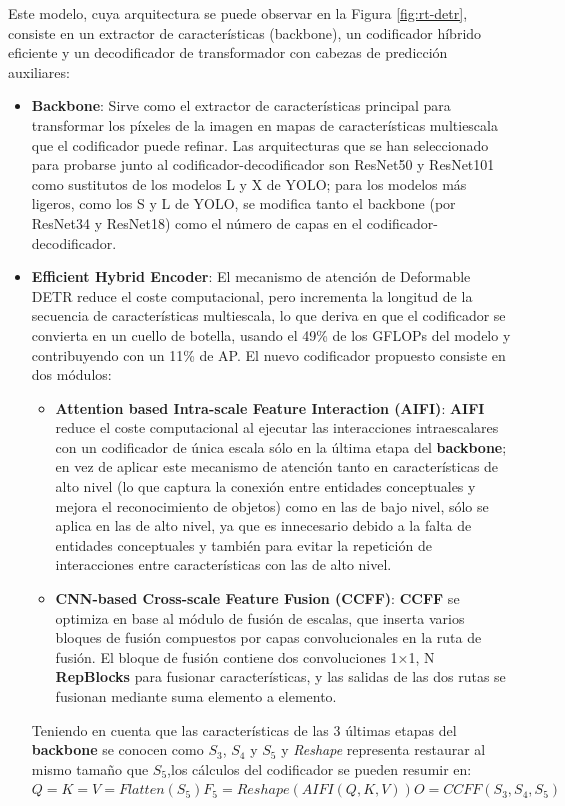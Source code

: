 \documentclass[12pt,a4paper,onecolumn,oneside]{report}
\begin{document}
Este modelo, cuya arquitectura se puede observar en la Figura \ref{fig:rt-detr}, consiste en un extractor de características (backbone), un codificador híbrido eficiente y un decodificador de transformador con cabezas de predicción auxiliares:
\begin{itemize}
    \item \textbf{Backbone}: Sirve como el extractor de características principal para transformar los píxeles de la imagen en mapas de características multiescala que el codificador puede refinar. Las arquitecturas que se han seleccionado para probarse junto al codificador-decodificador son ResNet50 y ResNet101 \cite{he2015deepresiduallearningimage} como sustitutos de los modelos L y X de YOLO; para los modelos más ligeros, como los S y L de YOLO, se modifica tanto el backbone (por ResNet34 y ResNet18) como el número de capas en el codificador-decodificador.
    
    \item \textbf{Efficient Hybrid Encoder}: El mecanismo de atención de Deformable DETR reduce el coste computacional, pero incrementa la longitud de la secuencia de características multiescala, lo que deriva en que el codificador se convierta en un cuello de botella, usando el 49\% de los GFLOPs del modelo y contribuyendo con un 11\% de AP. El nuevo codificador propuesto consiste en dos módulos:
    \begin{itemize}
        \item \textbf{Attention based Intra-scale Feature Interaction (AIFI)}: \textbf{AIFI} reduce el coste computacional al ejecutar las interacciones intraescalares con un codificador de única escala sólo en la última etapa del \textbf{backbone}; en vez de aplicar este mecanismo de atención tanto en características de alto nivel (lo que captura la conexión entre entidades conceptuales y mejora el reconocimiento de objetos) como en las de bajo nivel, sólo se aplica en las de alto nivel, ya que es innecesario debido a la falta de entidades conceptuales y también para evitar la repetición de interacciones entre características con las de alto nivel.
        \item \textbf{CNN-based Cross-scale Feature Fusion (CCFF)}: \textbf{CCFF} se optimiza en base al módulo de fusión de escalas, que inserta varios bloques de fusión compuestos por capas convolucionales en la ruta de fusión. El bloque de fusión contiene dos convoluciones 1×1, N \textbf{RepBlocks} \cite{ding2021repvggmakingvggstyleconvnets} para fusionar características, y las salidas de las dos rutas se fusionan mediante suma elemento a elemento.
    \end{itemize}
    Teniendo en cuenta que las características de las 3 últimas etapas del \textbf{backbone} se conocen como {$S_3$, $S_4$ y $S_5$} y \textit{Reshape} representa restaurar al mismo tamaño que $S_5$,los cálculos del codificador se pueden resumir en:
    \begin{math}
        Q = K = V = Flatten(S_5)
        F_5 = Reshape(AIFI(Q, K, V))
        O = CCFF({S_3, S_4, S_5})
    \end{math}


\end{itemize}
\end{document}

